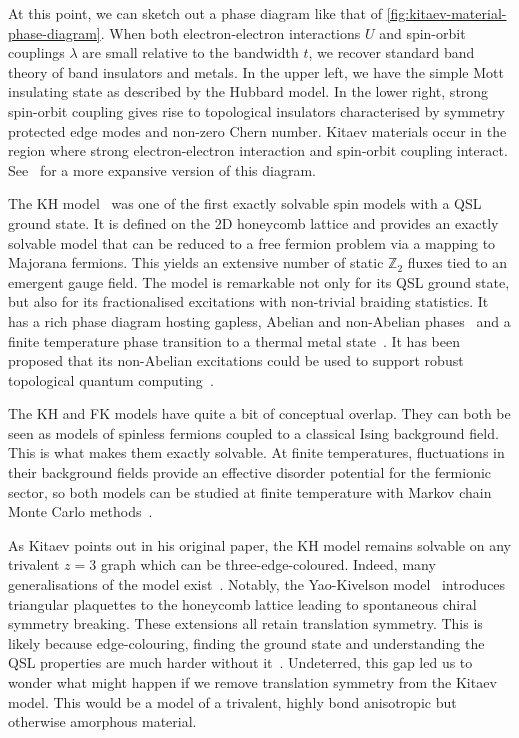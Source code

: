 At this point, we can sketch out a phase diagram like that of \cref{fig:kitaev-material-phase-diagram}. When both electron-electron interactions \(U\) and spin-orbit couplings \(\lambda\) are small relative to the bandwidth \(t\), we recover standard band theory of band insulators and metals. In the upper left, we have the simple Mott insulating state as described by the Hubbard model. In the lower right, strong spin-orbit coupling gives rise to topological insulators characterised by symmetry protected edge modes and non-zero Chern number. Kitaev materials occur in the region where strong electron-electron interaction and spin-orbit coupling interact. See~\autocite{witczak-krempaCorrelatedQuantumPhenomena2014} for a more expansive version of this diagram.

The KH model~\autocite{kitaevAnyonsExactlySolved2006} was one of the first exactly solvable spin models with a QSL ground state. It is defined on the 2D honeycomb lattice and provides an exactly solvable model that can be reduced to a free fermion problem via a mapping to Majorana fermions. This yields an extensive number of static \(\mathbb Z_2\) fluxes tied to an emergent gauge field. The model is remarkable not only for its QSL ground state, but also for its fractionalised excitations with non-trivial braiding statistics. It has a rich phase diagram hosting gapless, Abelian and non-Abelian phases~\autocite{knolleDynamicsFractionalizationQuantum2015} and a finite temperature phase transition to a thermal metal state~\autocite{selfThermallyInducedMetallic2019}. It has been proposed that its non-Abelian excitations could be used to support robust topological quantum computing~\autocite{kitaev_fault-tolerant_2003,freedmanTopologicalQuantumComputation2003,nayakNonAbelianAnyonsTopological2008}.

The KH and FK models have quite a bit of conceptual overlap. They can both be seen as models of spinless fermions coupled to a classical Ising background field. This is what makes them exactly solvable. At finite temperatures, fluctuations in their background fields provide an effective disorder potential for the fermionic sector, so both models can be studied at finite temperature with Markov chain Monte Carlo methods~\autocite{antipovInteractionTunedAndersonMott2016,selfThermallyInducedMetallic2019}.

As Kitaev points out in his original paper, the KH model remains solvable on any trivalent \(z=3\) graph which can be three-edge-coloured. Indeed, many generalisations of the model exist~\autocite{Baskaran2007,Baskaran2008,Nussinov2009,OBrienPRB2016,hermanns2015weyl}. Notably, the Yao-Kivelson model~\autocite{yaoExactChiralSpin2007} introduces triangular plaquettes to the honeycomb lattice leading to spontaneous chiral symmetry breaking. These extensions all retain translation symmetry. This is likely because edge-colouring, finding the ground state and understanding the QSL properties are much harder without it~\autocite{eschmann2019thermodynamics,Peri2020}. Undeterred, this gap led us to wonder what might happen if we remove translation symmetry from the Kitaev model. This would be a model of a trivalent, highly bond anisotropic but otherwise amorphous material.

